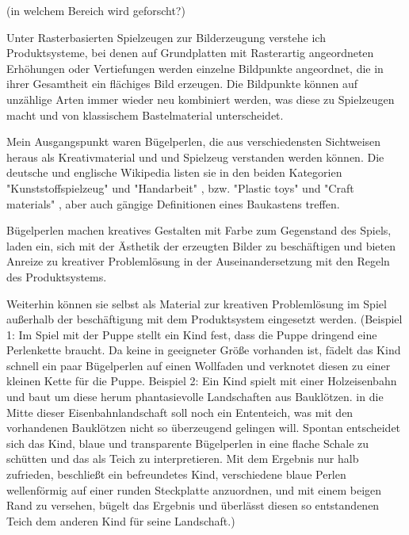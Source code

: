 \documentclass[11pt,a4paper,twoside]{scrreprt}
\begin{document}
(in welchem Bereich wird geforscht?)

Unter Rasterbasierten Spielzeugen zur Bilderzeugung verstehe ich Produktsysteme, bei denen auf Grundplatten mit Rasterartig angeordneten Erhöhungen oder Vertiefungen werden einzelne Bildpunkte angeordnet, die in ihrer Gesamtheit ein flächiges Bild erzeugen. Die Bildpunkte können auf unzählige Arten immer wieder neu kombiniert werden, was diese zu Spielzeugen macht und von klassischem Bastelmaterial unterscheidet.

Mein Ausgangspunkt waren Bügelperlen, die aus verschiedensten Sichtweisen heraus als Kreativmaterial und und Spielzeug verstanden werden können. Die deutsche und englische Wikipedia listen sie in den beiden Kategorien "Kunststoffspielzeug" und "Handarbeit" \cite{wiki:de}, bzw. "Plastic toys" und "Craft materials" \cite{wiki:en}, aber auch gängige Definitionen eines Baukastens treffen. \cite{Leinweber}

Bügelperlen machen kreatives Gestalten mit Farbe zum Gegenstand des Spiels, laden ein, sich mit der Ästhetik der erzeugten Bilder zu beschäftigen und bieten Anreize zu kreativer Problemlösung in der Auseinandersetzung mit den Regeln des Produktsystems. \begin{comment} ist das so? Wie kann ich diese These belegen? \end{comment}
Weiterhin können sie selbst als Material zur kreativen Problemlösung im Spiel außerhalb der beschäftigung mit dem Produktsystem eingesetzt werden. (Beispiel 1: Im Spiel mit der Puppe stellt ein Kind fest, dass die Puppe dringend eine Perlenkette braucht. Da keine in geeigneter Größe vorhanden ist, fädelt das Kind schnell ein paar Bügelperlen auf einen Wollfaden und verknotet diesen zu einer kleinen Kette für die Puppe. Beispiel 2: Ein Kind spielt mit einer Holzeisenbahn und baut um diese herum phantasievolle  Landschaften aus Bauklötzen. in die Mitte dieser Eisenbahnlandschaft soll noch ein Ententeich, was mit den vorhandenen Bauklötzen nicht so überzeugend gelingen will. Spontan entscheidet sich das Kind, blaue und transparente Bügelperlen in eine flache Schale zu schütten und das als Teich zu interpretieren. Mit dem Ergebnis nur halb zufrieden, beschließt ein befreundetes Kind, verschiedene blaue Perlen wellenförmig auf einer runden Steckplatte anzuordnen, und mit einem beigen Rand zu versehen, bügelt das Ergebnis und überlässt diesen so entstandenen Teich dem anderen Kind für seine Landschaft.) \begin{comment} Gibt es knappere oder andere Formen der Erläuterung, was ich meine, außer Beispiele auszuformulieren? \end{comment}
\end{document}
